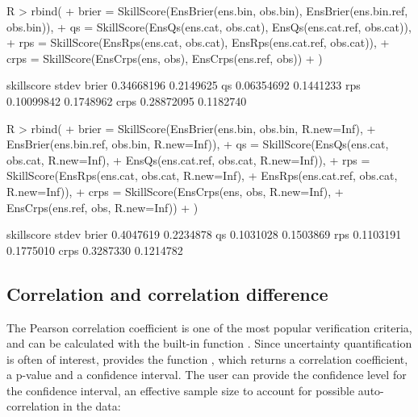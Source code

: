 \documentclass[article]{jss}
\begin{document}
\begin{Schunk}
\begin{Sinput}
R > rbind(
+   brier = SkillScore(EnsBrier(ens.bin, obs.bin), EnsBrier(ens.bin.ref, obs.bin)),
+   qs    = SkillScore(EnsQs(ens.cat, obs.cat),    EnsQs(ens.cat.ref, obs.cat)),
+   rps   = SkillScore(EnsRps(ens.cat, obs.cat),   EnsRps(ens.cat.ref, obs.cat)),
+   crps  = SkillScore(EnsCrps(ens, obs),          EnsCrps(ens.ref, obs))
+ )
\end{Sinput}
\begin{Soutput}
      skillscore     stdev
brier 0.34668196 0.2149625
qs    0.06354692 0.1441233
rps   0.10099842 0.1748962
crps  0.28872095 0.1182740
\end{Soutput}
\end{Schunk}

\begin{Schunk}
\begin{Sinput}
R > rbind(
+   brier = SkillScore(EnsBrier(ens.bin, obs.bin, R.new=Inf), 
+                      EnsBrier(ens.bin.ref, obs.bin, R.new=Inf)),
+   qs    = SkillScore(EnsQs(ens.cat, obs.cat, R.new=Inf), 
+                      EnsQs(ens.cat.ref, obs.cat, R.new=Inf)),
+   rps   = SkillScore(EnsRps(ens.cat, obs.cat, R.new=Inf), 
+                      EnsRps(ens.cat.ref, obs.cat, R.new=Inf)),
+   crps  = SkillScore(EnsCrps(ens, obs, R.new=Inf), 
+                      EnsCrps(ens.ref, obs, R.new=Inf))
+ )
\end{Sinput}
\begin{Soutput}
      skillscore     stdev
brier  0.4047619 0.2234878
qs     0.1031028 0.1503869
rps    0.1103191 0.1775010
crps   0.3287330 0.1214782
\end{Soutput}
\end{Schunk}


\subsection{Correlation and correlation difference}

The Pearson correlation coefficient is one of the most popular verification criteria, and can be calculated with the built-in  function .
Since uncertainty quantification is often of interest,  provides the function , which returns a correlation coefficient, a p-value and a confidence interval.
The user can provide the confidence level for the confidence interval, an effective sample size to account for possible auto-correlation in the data:
\end{document}
